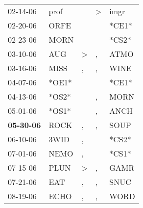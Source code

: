 \begin{supertabular}{p{0.07\textwidth}p{0.06\textwidth}p{0.02\textwidth}p{0.02\textwidth}p{0.06\textwidth}}
          02-14-06\textsuperscript{} &           prof\textsuperscript{} &                  &     \textgreater &           imgr\textsuperscript{} \\
          02-20-06\textsuperscript{} &           ORFE\textsuperscript{} &                  &                  &                            *CE1* \\
          02-23-06\textsuperscript{} &           MORN\textsuperscript{} &                  &                  &                            *CS2* \\
          03-10-06\textsuperscript{} &            AUG\textsuperscript{} &     \textgreater &                , &           ATMO\textsuperscript{} \\
          03-16-06\textsuperscript{} &           MISS\textsuperscript{} &                , &                , &           WINE\textsuperscript{} \\
          04-07-06\textsuperscript{} &                            *OE1* &                  &                  &                            *CE1* \\
          04-13-06\textsuperscript{} &                            *OS2* &                  &                , &           MORN\textsuperscript{} \\
          05-01-06\textsuperscript{} &                            *OS1* &                  &                , &           ANCH\textsuperscript{} \\
 \textbf{05-30-06\textsuperscript{}} &           ROCK\textsuperscript{} &                , &                , &           SOUP\textsuperscript{} \\
          06-10-06\textsuperscript{} &           3WID\textsuperscript{} &                , &                  &                            *CS2* \\
          07-01-06\textsuperscript{} &           NEMO\textsuperscript{} &                , &                  &                            *CS1* \\
          07-15-06\textsuperscript{} &           PLUN\textsuperscript{} &     \textgreater &                , &           GAMR\textsuperscript{} \\
          07-21-06\textsuperscript{} &            EAT\textsuperscript{} &                , &                , &           SNUC\textsuperscript{} \\
          08-19-06\textsuperscript{} &           ECHO\textsuperscript{} &                , &                , &           WORD\textsuperscript{} \\

\end{supertabular}
